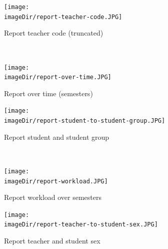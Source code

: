 \documentclass[11pt, a4paper, twoside]{article}   	%
\newcommand{\imageDir}{./images/}
\begin{document}
\begin{figure}[h]
\centering
\texttt{[image: \\imageDir/report-teacher-code.JPG]}
\caption{Report teacher code (truncated)}
\label{fig:is-data-flow-teacher}
\end{figure}
\ \newpage

\begin{figure}[h]
\centering
\texttt{[image: \\imageDir/report-over-time.JPG]}
\caption{Report over time (semesters)}
\label{fig:is-data-flow-teacher}
\end{figure}

\begin{figure}[h]
\centering
\texttt{[image: \\imageDir/report-student-to-student-group.JPG]}
\caption{Report student and student group}
\label{fig:is-data-flow-teacher}
\end{figure}
\ \newpage

\begin{figure}[h]
\centering
\texttt{[image: \\imageDir/report-workload.JPG]}
\caption{Report workload over semesters}
\label{fig:is-data-flow-teacher}
\end{figure}

\begin{figure}[h]
\centering
\texttt{[image: \\imageDir/report-teacher-to-student-sex.JPG]}
\caption{Report teacher and student sex}
\label{fig:is-data-flow-teacher}
\end{figure}
\ \newpage
\end{document}
